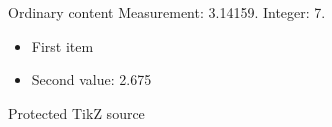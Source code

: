 \documentclass{beamer}
\begin{document}
\begin{frame}{Ordinary content}
  Measurement: 3.14159. Integer: 7.
  \begin{itemize}
    \item<1-> First item
    \item<2-> Second value: 2.675
  \end{itemize}
\end{frame}

\begin{frame}{Protected TikZ source}
\end{frame}
\end{document}
